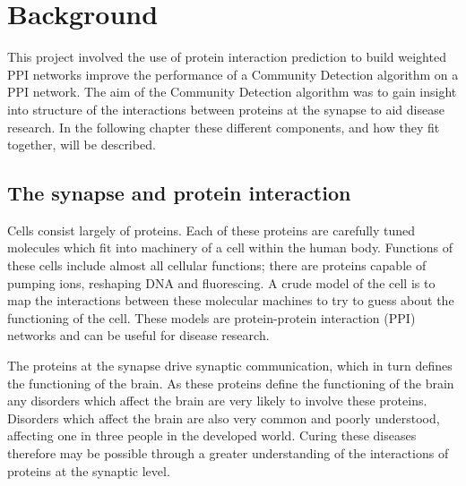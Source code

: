 \chapter{Background}
\label{background}

This project involved the use of protein interaction prediction to build weighted PPI networks improve the performance of a Community Detection algorithm on a PPI network.
The aim of the Community Detection algorithm was to gain insight into structure of the interactions between proteins at the synapse to aid disease research.
In the following chapter these different components, and how they fit together, will be described.

\section{The synapse and protein interaction}

Cells consist largely of proteins. 
Each of these proteins are carefully tuned molecules which fit into machinery of a cell within the human body. %
Functions of these cells include almost all cellular functions; there are proteins capable of pumping ions, reshaping DNA and fluorescing\autocite{alberts_molecular_2008}.
A crude model of the cell is to map the interactions between these molecular machines to try to guess about the functioning of the cell.
These models are protein-protein interaction (PPI) networks and can be useful for disease research.

The proteins at the synapse drive synaptic communication, which in turn defines the functioning of the brain.
As these proteins define the functioning of the brain any disorders which affect the brain are very likely to involve these proteins.
Disorders which affect the brain are also very common and poorly understood, affecting one in three people in the developed world.
Curing these diseases therefore may be possible through a greater understanding of the interactions of proteins at the synaptic level\autocites{synsys,chua_architecture_2010}.


